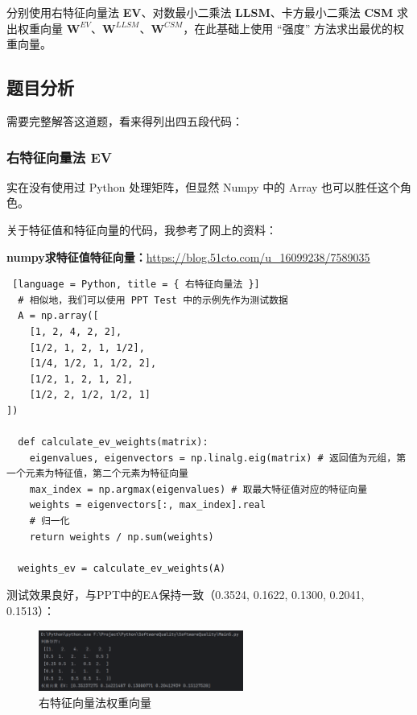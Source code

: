 分别使用右特征向量法 \textbf{EV}、对数最小二乘法 \textbf{LLSM}、卡方最小二乘法 \textbf{CSM} 求出权重向量 \(\mathbf{W}^{EV}\)、\(\mathbf{W}^{LLSM}\)、\(\mathbf{W}^{CSM}\)，在此基础上使用 “强度” 方法求出最优的权重向量。

\subsection{题目分析}

需要完整解答这道题，看来得列出四五段代码：

\subsubsection{右特征向量法 \textbf{EV}}
实在没有使用过 Python 处理矩阵，但显然 Numpy 中的 Array 也可以胜任这个角色。

关于特征值和特征向量的代码，我参考了网上的资料：

\textbf{numpy求特征值特征向量：}\href{https://blog.51cto.com/u_16099238/7589035}{\underline{https://blog.51cto.com/u\_16099238/7589035}}

\begin{lstlisting} [language = Python, title = { 右特征向量法 }]
  # 相似地，我们可以使用 PPT Test 中的示例先作为测试数据
  A = np.array([
    [1, 2, 4, 2, 2],
    [1/2, 1, 2, 1, 1/2],
    [1/4, 1/2, 1, 1/2, 2],
    [1/2, 1, 2, 1, 2],
    [1/2, 2, 1/2, 1/2, 1]
])

  def calculate_ev_weights(matrix):
    eigenvalues, eigenvectors = np.linalg.eig(matrix) # 返回值为元组，第一个元素为特征值，第二个元素为特征向量
    max_index = np.argmax(eigenvalues) # 取最大特征值对应的特征向量
    weights = eigenvectors[:, max_index].real
    # 归一化
    return weights / np.sum(weights)

  weights_ev = calculate_ev_weights(A)
\end{lstlisting}

测试效果良好，与PPT中的EA保持一致（0.3524, 0.1622, 0.1300, 0.2041, 0.1513）：

\begin{figure}[H]
  \centering
  \includegraphics[width=0.6\textwidth]{img6/EVtest.png}
  \caption{右特征向量法权重向量}
\end{figure}

